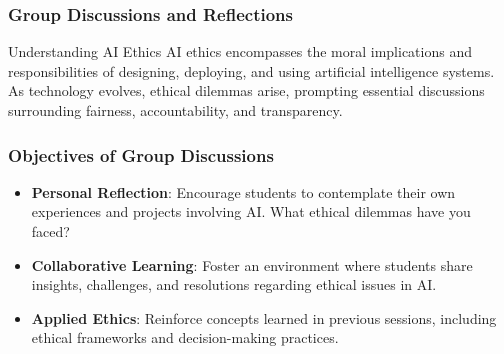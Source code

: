 \documentclass[aspectratio=169]{beamer}
\begin{document}
\begin{frame}[fragile]
    \frametitle{Group Discussions and Reflections}
    \begin{block}{Understanding AI Ethics}
        AI ethics encompasses the moral implications and responsibilities of designing, deploying, and using artificial intelligence systems. As technology evolves, ethical dilemmas arise, prompting essential discussions surrounding fairness, accountability, and transparency.
    \end{block}
\end{frame}

\begin{frame}[fragile]
    \frametitle{Objectives of Group Discussions}
    \begin{itemize}
        \item \textbf{Personal Reflection}: Encourage students to contemplate their own experiences and projects involving AI. What ethical dilemmas have you faced?
        \item \textbf{Collaborative Learning}: Foster an environment where students share insights, challenges, and resolutions regarding ethical issues in AI.
        \item \textbf{Applied Ethics}: Reinforce concepts learned in previous sessions, including ethical frameworks and decision-making practices.
    \end{itemize}
\end{frame}
\end{document}
